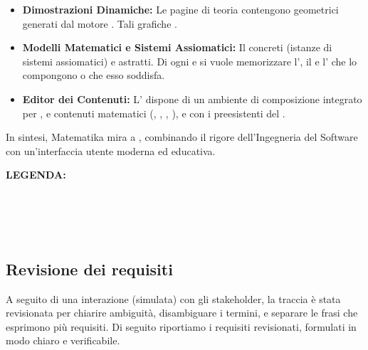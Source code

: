 \documentclass[12pt,a4paper]{article}
\begin{document}
\begin{itemize}
    \item \textbf{Dimostrazioni Dinamiche:} Le pagine di teoria contengono  geometrici generati dal motore . Tali grafiche .
    \item \textbf{Modelli Matematici e Sistemi Assiomatici:} Il   concreti (istanze di sistemi assiomatici) e  astratti. Di ogni  e  si vuole memorizzare l', il  e l' che lo compongono o che esso soddisfa.
    \item \textbf{Editor dei Contenuti:} L' dispone di un ambiente di composizione integrato per ,  e  contenuti matematici (, , , ),  e  con i  preesistenti del .
\end{itemize}

In sintesi, Matematika mira a , combinando il rigore dell'Ingegneria del Software con un'interfaccia utente moderna ed educativa.

\vspace{0.5cm}
\textbf{LEGENDA:} \\
 \\
 \\
 \\
 \\

\subsection{Revisione dei requisiti}
A seguito di una interazione (simulata) con gli stakeholder, la traccia è stata revisionata per chiarire ambiguità, disambiguare i termini, e separare le frasi che esprimono più requisiti. Di seguito riportiamo i requisiti revisionati, formulati in modo chiaro e verificabile.
\end{document}
